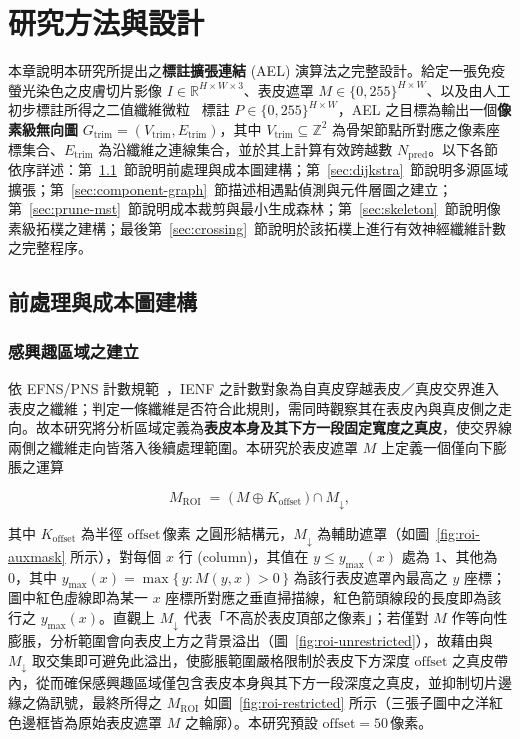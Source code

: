 
\chapter{研究方法與設計}
\label{chap:method}

本章說明本研究所提出之\textbf{標註擴張連結} (AEL) 演算法之完整設計。給定一張免疫螢光染色之皮膚切片影像 $I \in \mathbb{R}^{H \times W \times 3}$、表皮遮罩 $M \in \{0, 255\}^{H \times W}$、以及由人工初步標註所得之二值纖維微粒~\cite{hsueh2026machine} 標註 $P \in \{0, 255\}^{H \times W}$，AEL 之目標為輸出一個\textbf{像素級無向圖} $G_{\text{trim}} = (V_{\text{trim}}, E_{\text{trim}})$，其中 $V_{\text{trim}} \subseteq \mathbb{Z}^2$ 為骨架節點所對應之像素座標集合、$E_{\text{trim}}$ 為沿纖維之連線集合，並於其上計算有效跨越數 $N_{\text{pred}}$。以下各節依序詳述：第~\ref{sec:preprocessing}~節說明前處理與成本圖建構；第~\ref{sec:dijkstra}~節說明多源區域擴張；第~\ref{sec:component-graph}~節描述相遇點偵測與元件層圖之建立；第~\ref{sec:prune-mst}~節說明成本裁剪與最小生成森林；第~\ref{sec:skeleton}~節說明像素級拓樸之建構；最後第~\ref{sec:crossing}~節說明於該拓樸上進行有效神經纖維計數之完整程序。

\section{前處理與成本圖建構}
\label{sec:preprocessing}

\subsection{感興趣區域之建立}
\label{subsec:roi}

依 EFNS/PNS 計數規範~\cite{lauria2010skinbiopsy}，IENF 之計數對象為自真皮穿越表皮／真皮交界進入表皮之纖維；判定一條纖維是否符合此規則，需同時觀察其在表皮內與真皮側之走向。故本研究將分析區域定義為\textbf{表皮本身及其下方一段固定寬度之真皮}，使交界線兩側之纖維走向皆落入後續處理範圍。本研究於表皮遮罩 $M$ 上定義一個僅向下膨脹之運算

\begin{equation}
  M_{\text{ROI}} \;=\; \big(\,M \oplus K_{\text{offset}}\,\big) \cap M_{\downarrow},
  \label{eq:roi}
\end{equation}

\noindent 其中 $K_{\text{offset}}$ 為半徑 $\text{offset}\,\text{像素}$ 之圓形結構元，$M_{\downarrow}$ 為輔助遮罩（如圖~\ref{fig:roi-auxmask} 所示），對每個 $x$ 行 (column)，其值在 $y \le y_{\max}(x)$ 處為 1、其他為 0，其中 $y_{\max}(x) = \max\{\,y : M(y, x) > 0\,\}$ 為該行表皮遮罩內最高之 $y$ 座標；圖中紅色虛線即為某一 $x$ 座標所對應之垂直掃描線，紅色箭頭線段的長度即為該行之 $y_{\max}(x)$。直觀上 $M_{\downarrow}$ 代表「不高於表皮頂部之像素」；若僅對 $M$ 作等向性膨脹，分析範圍會向表皮上方之背景溢出（圖~\ref{fig:roi-unrestricted}），故藉由與 $M_{\downarrow}$ 取交集即可避免此溢出，使膨脹範圍嚴格限制於表皮下方深度 $\text{offset}$ 之真皮帶內，從而確保感興趣區域僅包含表皮本身與其下方一段深度之真皮，並抑制切片邊緣之偽訊號，最終所得之 $M_{\text{ROI}}$ 如圖~\ref{fig:roi-restricted} 所示（三張子圖中之洋紅色邊框皆為原始表皮遮罩 $M$ 之輪廓）。本研究預設 $\text{offset} = 50\,\text{像素}$。

